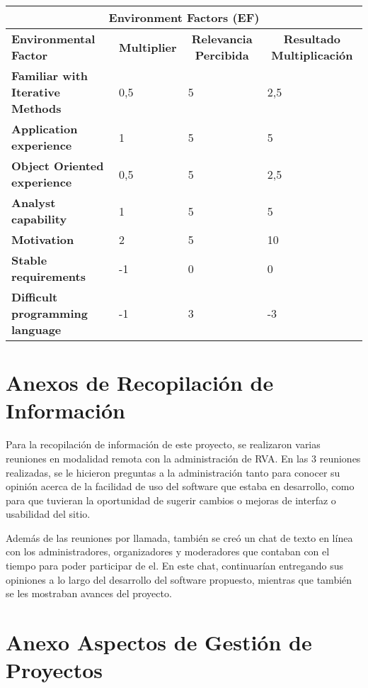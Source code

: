 \begin{center}
  \begin{tabular}{ | p{4cm} | p{2cm} | p{4cm}| p{5cm} | } 
    \hline
    \multicolumn{4}{|c|}{\textbf{Environment Factors (EF)}} \\
    \hline
    \multicolumn{1}{|p{3cm}|}{\textbf{Environmental Factor}} & \multicolumn{1}{|c|}{\textbf{Multiplier}} & \multicolumn{1}{|c|}{\textbf{Relevancia Percibida}} & \multicolumn{1}{|c|}{\textbf{Resultado Multiplicación}} \\
    \hline
    
    {\textbf{Familiar with Iterative Methods}} & 0,5 & 5 & 2,5 \\ \hline
    {\textbf{Application experience}} & 1 & 5 & 5 \\ \hline
    {\textbf{Object Oriented experience}} & 0,5 & 5 & 2,5 \\ \hline
    {\textbf{Analyst capability}} & 1 & 5 & 5 \\ \hline
    {\textbf{Motivation}} & 2 & 5 & 10 \\ \hline
    {\textbf{Stable requirements}} & -1 & 0 & 0 \\ \hline
    {\textbf{Difficult programming language}} & -1 & 3 & -3 \\ \hline
  \end{tabular}
\end{center}

\section{Anexos de Recopilación de Información}
Para la recopilación de información de este proyecto, se realizaron varias reuniones en modalidad remota con la administración de RVA. En las 3 reuniones realizadas, se le hicieron preguntas a la administración tanto para conocer su opinión acerca de la facilidad de uso del software que estaba en desarrollo, como para que tuvieran la oportunidad de sugerir cambios o mejoras de interfaz o usabilidad del sitio.

Además de las reuniones por llamada, también se creó un chat de texto en línea con los administradores, organizadores y moderadores que contaban con el tiempo para poder participar de el. En este chat, continuarían entregando sus opiniones a lo largo del desarrollo del software propuesto, mientras que también se les mostraban avances del proyecto.

\section{Anexo Aspectos de Gestión de Proyectos}

